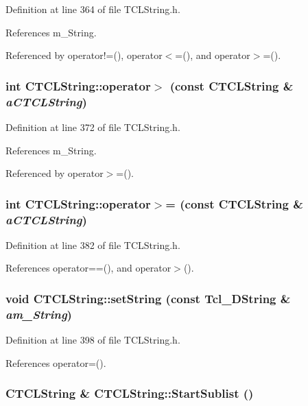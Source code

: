 Definition at line 364 of file TCLString.h.

References m\_\-String.

Referenced by operator!=(), operator$<$=(), and operator$>$=().
\subsubsection{\setlength{\rightskip}{0pt plus 5cm}int CTCLString::operator$>$ (const CTCLString \& {\em a\-CTCLString})\hspace{0.3cm}{\tt  [inline]}}\label{classCTCLString_a9}




Definition at line 372 of file TCLString.h.

References m\_\-String.

Referenced by operator$>$=().
\subsubsection{\setlength{\rightskip}{0pt plus 5cm}int CTCLString::operator$>$= (const CTCLString \& {\em a\-CTCLString})\hspace{0.3cm}{\tt  [inline]}}\label{classCTCLString_a11}




Definition at line 382 of file TCLString.h.

References operator==(), and operator$>$().
\subsubsection{\setlength{\rightskip}{0pt plus 5cm}void CTCLString::set\-String (const Tcl\_\-DString \& {\em am\_\-String})\hspace{0.3cm}{\tt  [inline]}}\label{classCTCLString_a14}




Definition at line 398 of file TCLString.h.

References operator=().
\subsubsection{\setlength{\rightskip}{0pt plus 5cm}CTCLString \& CTCLString::Start\-Sublist ()}\label{classCTCLString_a23}




